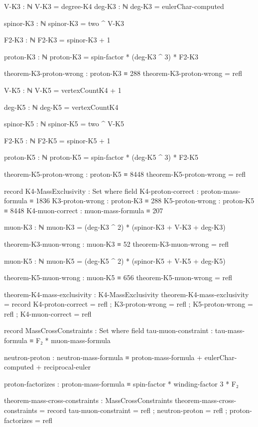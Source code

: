 \documentclass[11pt,a4paper]{book}
\begin{document}
\begin{code}
V-K3 : ℕ
V-K3 = degree-K4
deg-K3 : ℕ
deg-K3 = eulerChar-computed

spinor-K3 : ℕ
spinor-K3 = two ^ V-K3

F2-K3 : ℕ
F2-K3 = spinor-K3 + 1

proton-K3 : ℕ
proton-K3 = spin-factor * (deg-K3 ^ 3) * F2-K3

theorem-K3-proton-wrong : proton-K3 ≡ 288
theorem-K3-proton-wrong = refl

V-K5 : ℕ
V-K5 = vertexCountK4 + 1

deg-K5 : ℕ
deg-K5 = vertexCountK4

spinor-K5 : ℕ
spinor-K5 = two ^ V-K5

F2-K5 : ℕ
F2-K5 = spinor-K5 + 1

proton-K5 : ℕ
proton-K5 = spin-factor * (deg-K5 ^ 3) * F2-K5

theorem-K5-proton-wrong : proton-K5 ≡ 8448
theorem-K5-proton-wrong = refl

record K4-MassExclusivity : Set where
  field
    K4-proton-correct : proton-mass-formula ≡ 1836
    K3-proton-wrong   : proton-K3 ≡ 288
    K5-proton-wrong   : proton-K5 ≡ 8448
    K4-muon-correct   : muon-mass-formula ≡ 207

muon-K3 : ℕ
muon-K3 = (deg-K3 ^ 2) * (spinor-K3 + V-K3 + deg-K3)

theorem-K3-muon-wrong : muon-K3 ≡ 52
theorem-K3-muon-wrong = refl

muon-K5 : ℕ
muon-K5 = (deg-K5 ^ 2) * (spinor-K5 + V-K5 + deg-K5)

theorem-K5-muon-wrong : muon-K5 ≡ 656
theorem-K5-muon-wrong = refl

theorem-K4-mass-exclusivity : K4-MassExclusivity
theorem-K4-mass-exclusivity = record
  { K4-proton-correct = refl
  ; K3-proton-wrong   = refl
  ; K5-proton-wrong   = refl
  ; K4-muon-correct   = refl
  }

record MassCrossConstraints : Set where
  field
    tau-muon-constraint    : tau-mass-formula ≡ F₂ * muon-mass-formula
    
    neutron-proton    : neutron-mass-formula ≡ proton-mass-formula + eulerChar-computed + reciprocal-euler
    
    proton-factorizes : proton-mass-formula ≡ spin-factor * winding-factor 3 * F₂

theorem-mass-cross-constraints : MassCrossConstraints
theorem-mass-cross-constraints = record
  { tau-muon-constraint    = refl
  ; neutron-proton    = refl
  ; proton-factorizes = refl
  }

\end{code}
\end{document}

